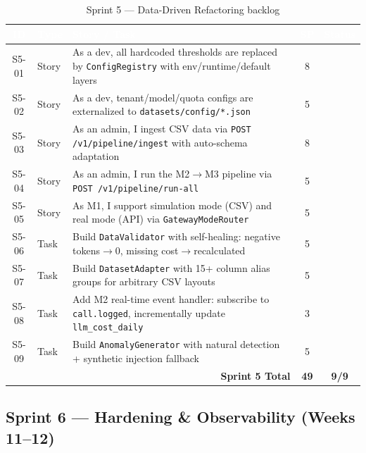 \documentclass[12pt,a4paper,twoside]{report}
\newcommand{\cmark}{\ding{51}}
\begin{document}
\begin{table}[H]
\centering
\small
\begin{tabularx}{\textwidth}{|c|l|X|c|c|}
\hline
\rowcolor{tabheader}
\textcolor{white}{\textbf{ID}} &
\textcolor{white}{\textbf{Type}} &
\textcolor{white}{\textbf{Story / Task}} &
\textcolor{white}{\textbf{SP}} &
\textcolor{white}{\textbf{Status}} \\
\hline
S5-01 & Story & As a dev, all hardcoded thresholds are replaced by \texttt{ConfigRegistry} with env/runtime/default layers & 8 & \cmark \\
\hline
S5-02 & Story & As a dev, tenant/model/quota configs are externalized to \texttt{datasets/config/*.json} & 5 & \cmark \\
\hline
S5-03 & Story & As an admin, I ingest CSV data via \texttt{POST /v1/pipeline/ingest} with auto-schema adaptation & 8 & \cmark \\
\hline
S5-04 & Story & As an admin, I run the M2$\rightarrow$M3 pipeline via \texttt{POST /v1/pipeline/run-all} & 5 & \cmark \\
\hline
S5-05 & Story & As M1, I support simulation mode (CSV) and real mode (API) via \texttt{GatewayModeRouter} & 5 & \cmark \\
\hline
S5-06 & Task & Build \texttt{DataValidator} with self-healing: negative tokens$\rightarrow$0, missing cost$\rightarrow$recalculated & 5 & \cmark \\
\hline
S5-07 & Task & Build \texttt{DatasetAdapter} with 15+ column alias groups for arbitrary CSV layouts & 5 & \cmark \\
\hline
S5-08 & Task & Add M2 real-time event handler: subscribe to \texttt{call.logged}, incrementally update \texttt{llm\_cost\_daily} & 3 & \cmark \\
\hline
S5-09 & Task & Build \texttt{AnomalyGenerator} with natural detection + synthetic injection fallback & 5 & \cmark \\
\hline
\multicolumn{3}{|r|}{\textbf{Sprint 5 Total}} & \textbf{49} & \textbf{9/9} \\
\hline
\end{tabularx}
\caption{Sprint 5 — Data-Driven Refactoring backlog}
\end{table}

\subsection{Sprint 6 — Hardening \& Observability (Weeks 11--12)}
\end{document}
